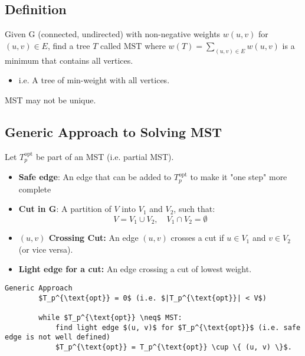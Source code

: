 \subsection{Definition}
\begin{definition}
    Given G (connected, undirected) with non-negative weights $w(u,v)$ for $(u,v) \in E$, find a tree $T$ called $\text{MST}$ where $w(T) = \sum_{(u,v) \in E} w(u,v)$ is a minimum that contains all vertices. 
    \begin{itemize}
        \item i.e. A tree of min-weight with all vertices.
    \end{itemize}
\end{definition}

\begin{warning}
    MST may not be unique.
\end{warning}

\subsection{Generic Approach to Solving MST}
\begin{intuition}
    Let \( T_p^{\text{opt}} \) be part of an MST (i.e. partial MST).
    \begin{itemize}
        \item \textbf{Safe edge}: An edge that can be added to \( T_p^{\text{opt}} \) to make it "one step" more complete

        \item \textbf{Cut in G}: A partition of \( V \) into \( V_1 \) and \( V_2 \), such that:
        \[
        V = V_1 \cup V_2, \quad V_1 \cap V_2 = \emptyset
        \]
        \item \textbf{$(u,v)$ Crossing Cut:} An edge \( (u, v) \) crosses a cut if \( u \in V_1 \) and \( v \in V_2 \) (or vice versa).
        \item \textbf{Light edge for a cut:} An edge crossing a cut of lowest weight.
    \end{itemize}

    \begin{lstlisting}[mathescape]
        Generic Approach 
        $T_p^{\text{opt}} = 0$ (i.e. $|T_p^{\text{opt}}| < V$)
        
        while $T_p^{\text{opt}} \neq$ MST:
            find light edge $(u, v)$ for $T_p^{\text{opt}}$ (i.e. safe edge is not well defined)
            $T_p^{\text{opt}} = T_p^{\text{opt}} \cup \{ (u, v) \}$.
        \end{lstlisting}        
\end{intuition}

